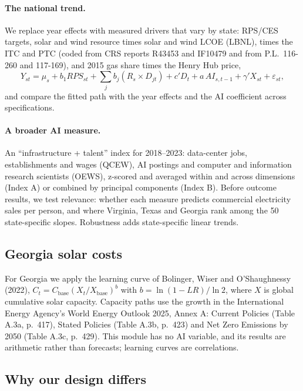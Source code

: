 \paragraph{The national trend.} We replace year effects with measured drivers that vary by state: RPS/CES targets, solar and wind resource times solar and wind LCOE (LBNL), times the ITC and PTC (coded from CRS reports R43453 and IF10479 and from P.L.\ 116-260 and 117-169), and 2015 gas share times the Henry Hub price,
\begin{equation}
Y_{st} = \mu_s + b_1 RPS_{st} + \sum_j b_j (R_s \times D_{jt}) + c' D_t + a\, AI_{s,t-1} + \gamma' X_{st} + \varepsilon_{st},
\end{equation}
and compare the fitted path with the year effects and the AI coefficient across specifications.

\paragraph{A broader AI measure.} An ``infrastructure + talent'' index for 2018--2023: data-center jobs, establishments and wages (QCEW), AI postings and computer and information research scientists (OEWS), z-scored and averaged within and across dimensions (Index A) or combined by principal components (Index B). Before outcome results, we test relevance: whether each measure predicts commercial electricity sales per person, and where Virginia, Texas and Georgia rank among the 50 state-specific slopes. Robustness adds state-specific linear trends.

\subsection{Georgia solar costs}
For Georgia we apply the learning curve of Bolinger, Wiser and O'Shaughnessy (2022), $C_t = C_{\mathrm{base}} (X_t / X_{\mathrm{base}})^{b}$ with $b = \ln(1 - LR) / \ln 2$, where $X$ is global cumulative solar capacity. Capacity paths use the growth in the International Energy Agency's World Energy Outlook 2025, Annex A: Current Policies (Table A.3a, p.\ 417), Stated Policies (Table A.3b, p.\ 423) and Net Zero Emissions by 2050 (Table A.3c, p.\ 429). This module has no AI variable, and its results are arithmetic rather than forecasts; learning curves are correlations.

\subsection{Why our design differs}
